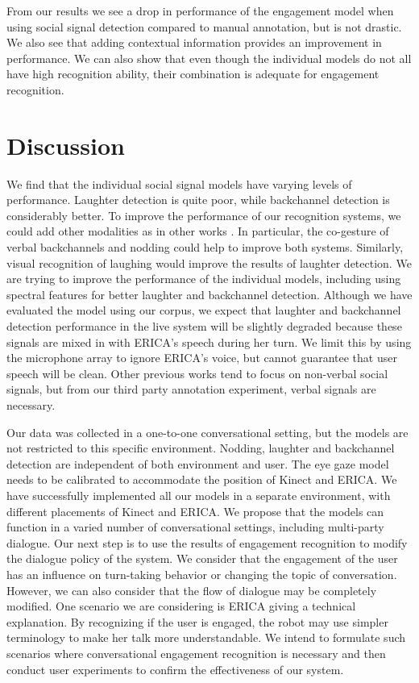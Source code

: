 \documentclass[letterpaper]{article} %
\begin{document}
\vspace{-3.26mm}
From our results we see a drop in performance of the engagement model when using social signal detection compared to manual annotation, but is not drastic. We also see that adding contextual information provides an improvement in performance. We can also show that even though the individual models do not all have high recognition ability, their combination is adequate for engagement recognition.

\section{Discussion}
We find that the individual social signal models have varying levels of performance. Laughter detection is quite poor, while backchannel detection is considerably better. To improve the performance of our recognition systems, we could add other modalities as in other works \cite{Morency2005}. In particular, the co-gesture of verbal backchannels and nodding could help to improve both systems. Similarly, visual recognition of laughing would improve the results of laughter detection. We are trying to improve the performance of the individual models, including using spectral features for better laughter and backchannel detection.  Although we have evaluated the model using our corpus, we expect that laughter and backchannel detection performance in the live system will be slightly degraded because these signals are mixed in with ERICA's speech during her turn. We limit this by using the microphone array to ignore ERICA's voice, but cannot guarantee that user speech will be clean. Other previous works tend to focus on non-verbal social signals, but from our third party annotation experiment, verbal signals are necessary.

Our data was collected in a one-to-one conversational setting, but the models are not restricted to this specific environment. Nodding, laughter and backchannel detection are independent of both environment and user. The eye gaze model needs to be calibrated to accommodate the position of Kinect and ERICA. We have successfully implemented all our models in a separate environment, with different placements of Kinect and ERICA. We propose that the models can function in a varied number of conversational settings, including multi-party dialogue.  Our next step is to use the results of engagement recognition to modify the dialogue policy of the system. We consider that the engagement of the user has an influence on turn-taking behavior or changing the topic of conversation. However, we can also consider that the flow of dialogue may be completely modified. One scenario we are considering is ERICA giving a technical explanation. By recognizing if the user is engaged, the robot may use simpler terminology to make her talk more understandable. We intend to formulate such scenarios where conversational engagement recognition is necessary and then conduct user experiments to confirm the effectiveness of our system.
\end{document}
